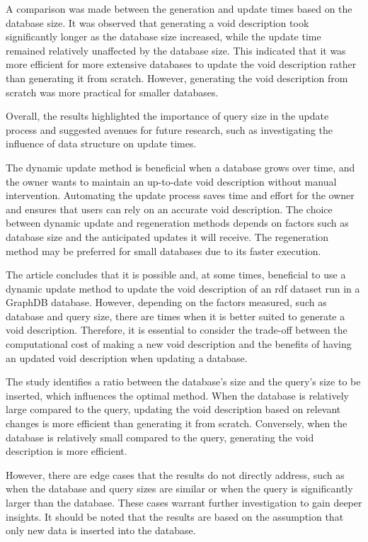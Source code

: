 A comparison was made between the generation and update times based on the database size. It was observed that generating a \gls{void} description took significantly longer as the database size increased, while the update time remained relatively unaffected by the database size. This indicated that it was more efficient for more extensive databases to update the \gls{void} description rather than generating it from scratch. However, generating the \gls{void} description from scratch was more practical for smaller databases.

Overall, the results highlighted the importance of query size in the update process and suggested avenues for future research, such as investigating the influence of data structure on update times.

The dynamic update method is beneficial when a database grows over time, and the owner wants to maintain an up-to-date \gls{void} description without manual intervention. Automating the update process saves time and effort for the owner and ensures that users can rely on an accurate \gls{void} description. The choice between dynamic update and regeneration methods depends on factors such as database size and the anticipated updates it will receive. The regeneration method may be preferred for small databases due to its faster execution.

The article concludes that it is possible and, at some times, beneficial to use a dynamic update method to update the \gls{void} description of an \gls{rdf} dataset run in a GraphDB database. However, depending on the factors measured, such as database and query size, there are times when it is better suited to generate a \gls{void} description. Therefore, it is essential to consider the trade-off between the computational cost of making a new \gls{void} description and the benefits of having an updated \gls{void} description when updating a database.

The study identifies a ratio between the database's size and the query's size to be inserted, which influences the optimal method. When the database is relatively large compared to the query, updating the \gls{void} description based on relevant changes is more efficient than generating it from scratch. Conversely, when the database is relatively small compared to the query, generating the \gls{void} description is more efficient.

However, there are edge cases that the results do not directly address, such as when the database and query sizes are similar or when the query is significantly larger than the database. These cases warrant further investigation to gain deeper insights. It should be noted that the results are based on the assumption that only new data is inserted into the database.
